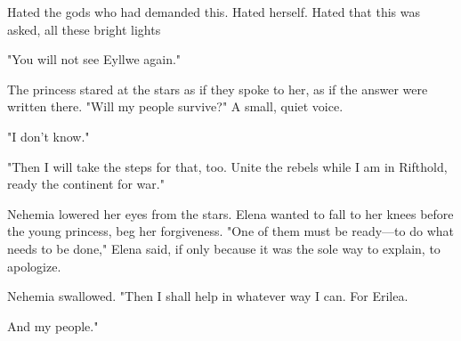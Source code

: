 Hated the gods who had demanded this.
Hated herself.
Hated that this was asked, all these bright lights 

"You will not see Eyllwe again."

The princess stared at the stars as if they spoke to her, as if the answer were written there.
"Will my people survive?"
A small, quiet voice.

"I don't know."

"Then I will take the steps for that, too.
Unite the rebels while I am in Rifthold, ready the continent for war."

Nehemia lowered her eyes from the stars.
Elena wanted to fall to her knees before the young princess, beg her forgiveness.
"One of them must be ready---to do what needs to be done," Elena said, if only because it was the sole way to explain, to apologize.

Nehemia swallowed.
"Then I shall help in whatever way I can.
For Erilea.

And my people."
